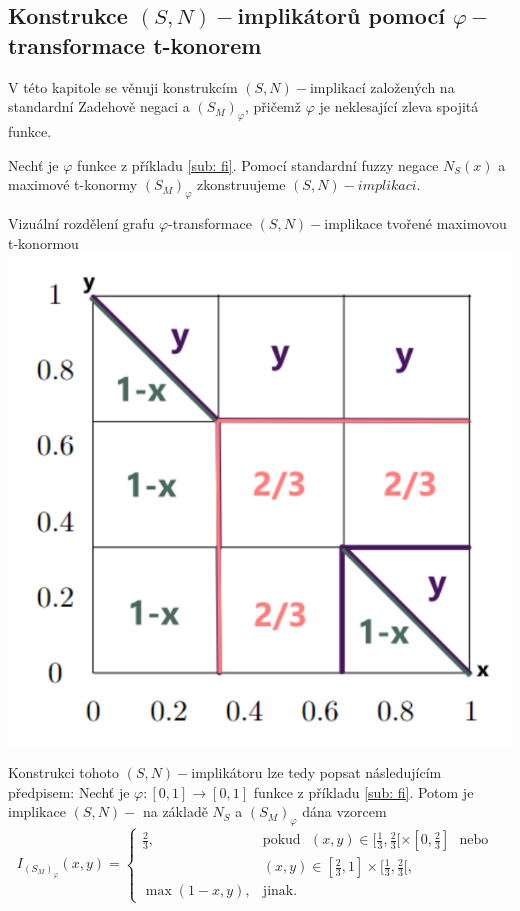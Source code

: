 \subsection{Konstrukce $(S,N)-$implik\'ator\r u pomoc\'i $\varphi-$transformace t-konorem}
 V této kapitole se věnuji konstrukcím $(S,N)-$implikací založených na standardní Zadehově negaci a $(S_M)_\varphi$, přičemž $\varphi$ je neklesající zleva spojitá funkce.
 
\begin{example}
    Nech\v t je $\varphi$ funkce z p\v ríkladu \ref{sub: fi}.  Pomocí standardní fuzzy negace $N_S(x)$ a maximové t-konormy $(S_M)_\varphi$  zkonstruujeme $(S,N)-implikaci$. 
\end{example}
   
     \begin{graph} 
     Vizu\' aln\' i rozd\v elen\'i grafu $\varphi$-transformace $(S,N)-$implikace tvořené maximovou t-konormou\\
        \centering
        \includegraphics[scale=0.8]{template-fig/phi-impli.pdf}
    \end{graph}


 Konstrukci tohoto $(S,N)-$implikátoru lze tedy popsat následujícím předpisem:
    Nech\v t je  $\varphi:[0,1]\rightarrow [0,1]$
funkce z příkladu \ref{sub: fi}.
Potom je implikace $(S,N)-$ na základě $N_S$ a $(S_M)_{\varphi}$ dána vzorcem
$$ I_{(S_M)_{\varphi}}(x,y) = \begin{cases} \frac{2}{3}, &\mbox {pokud~~}
(x,y)\in [\frac{1}{3},\frac{2}{3}[\times[0,\frac{2}{3}] \mbox{~~nebo~~}
\\ & (x,y)\in [\frac{2}{3},1]\times[\frac{1}{3},\frac{2}{3}[,
\\ \max(1-x,y), &\mbox {jinak.}
\end{cases} $$

